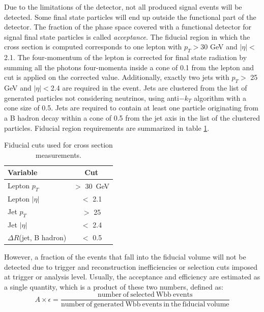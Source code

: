 Due to the limitations of the detector, not all produced signal events will be detected. Some final state particles will end up outside the functional part of the detector. The fraction of the phase space covered with a functional detector for signal final state particles is called \textit{acceptance}. The fiducial region in which the cross section is computed corresponds to one lepton with $p_T>$30 GeV and $|\eta|<$2.1. The four-momentum of the lepton is corrected for final state radiation by summing all the photons four-momenta inside a cone of 0.1 from the lepton and cut is applied on the corrected value. Additionally, exactly two jets with $p_T>$ 25 GeV and $|\eta|<$2.4 are required in the event. Jets are clustered from the list of generated particles not considering neutrinos, using anti$-k_T$ algorithm with a cone size of 0.5. Jets are required to contain at least one particle originating from a B hadron decay within a cone of 0.5 from the jet axis in the list of the clustered particles. Fiducial region requirements are summarized in table \ref{tab:fiducial}.             
\begin{table}[!htb]
\begin{center}
   \begin{tabular} {l c} \hline \hline
        Variable         & Cut \\
        \hline
        Lepton $p_T$    & $>$ 30\ GeV \\
        Lepton $|\eta|$   & $<$ 2.1 \\
        Jet $p_T$       & $>$ 25  \\
        Jet $|\eta|$      & $<$ 2.4 \\
        $\Delta R$(jet, B hadron) & $<$ 0.5 \\
        \hline\hline
   \end{tabular}
\caption{Fiducial cuts used for cross section measurements.}
\label{tab:fiducial}
\end{center}
\end{table}
However, a fraction of the events that fall into the fiducial volume will not be detected due to trigger and reconstruction inefficiencies or selection cuts imposed at trigger or analysis level. Usually, the acceptance and efficiency are estimated as a single quantity, which is a product of these two numbers, defined as:
\begin{equation}
A\times \epsilon=\frac{\mathrm{number\ of\ selected\ Wbb\ events}}{\mathrm{number\ of\ generated\ Wbb\ events\ in\ the\ fiducial\ volume}}
\end{equation}
